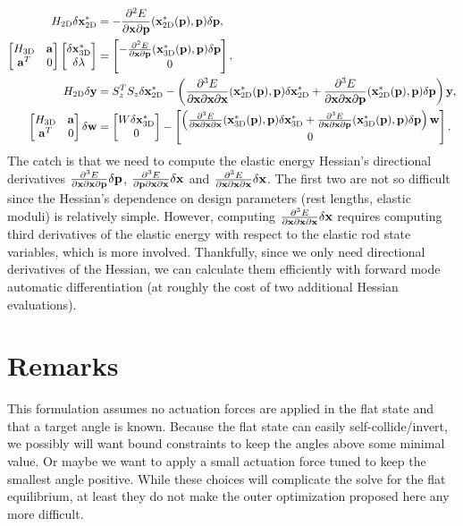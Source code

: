 \documentclass[10pt]{article}
\providecommand{\spder}[3]{\frac{\partial^2 #1}{\partial #2 \partial #3}}
\providecommand{\tpder}[4]{\frac{\partial^3 #1}{\partial #2 \partial #3 \partial #4}}
\renewcommand{\vec}[1]{{\bf #1}}
\def\a{\vec{a}}
\def\x{\vec{x}}
\def\y{\vec{y}}
\def\w{\vec{w}}
\def\p{\vec{p}}
\def\xflat{\vec{x}^*_\text{2D}}
\def\xdeploy{\vec{x}^*_\text{3D}}
\def\delp{\delta \p}
\def\delxflat{\delta \xflat}
\def\delxdeploy{\delta \xdeploy}
\def\delw{\delta \w}
\def\dely{\delta \y}
\begin{document}
\begin{align*}
    H_\text{2D} \delxflat &= -\spder{E}{\x}{\p}(\xflat(\p), \p) \delp, \\
    \begin{bmatrix} H_\text{3D} & \a \\ \a^T & 0 \end{bmatrix}\begin{bmatrix}\delxdeploy \\ \delta \lambda \end{bmatrix} &= \begin{bmatrix} -\spder{E}{\x}{\p}(\xdeploy(\p), \p) \delp \\ 0 \end{bmatrix}, \\
        H_{\text{2D}} \dely &= S_z^T S_z \delxflat - \left(\tpder{E}{\x}{\x}{\x}(\xflat(\p), \p) \delxflat + \tpder{E}{\x}{\x}{\p}(\xflat(\p), \p) \delp\right) \y, \\
    \begin{bmatrix} H_\text{3D} & \a \\ \a^T & 0 \end{bmatrix} \delw &=
    \begin{bmatrix} W \delxdeploy \\ 0\end{bmatrix}
        -
    \begin{bmatrix}\left(\tpder{E}{\x}{\x}{\x}(\xdeploy(\p), \p) \delxdeploy + \tpder{E}{\x}{\x}{\p}(\xdeploy(\p), \p) \delp\right) \w \\ 0 \end{bmatrix}.
\end{align*}
The catch is that we need to compute the elastic energy Hessian's directional derivatives
$\tpder{E}{\x}{\x}{\p} \delp$,
$\tpder{E}{\p}{\x}{\x} \delta \x$ and
$\tpder{E}{\x}{\x}{\x} \delta \x$. The first two are not so difficult since the
Hessian's dependence on design parameters (rest lengths, elastic moduli) is relatively simple.
However, computing $\tpder{E}{\x}{\x}{\x} \delta \x$ requires computing third derivatives of the
elastic energy with respect to the elastic rod state variables, which is more involved. Thankfully,
since we only need directional derivatives of the Hessian, we can calculate them efficiently with forward
mode automatic differentiation (at roughly the cost of two additional Hessian evaluations).

\section{Remarks}
This formulation assumes no actuation forces are applied in the flat state and that a target angle is known.
Because the flat state can easily self-collide/invert, we possibly will
want bound constraints to keep the angles above some minimal value. Or maybe we want to apply a small actuation force
tuned to keep the smallest angle positive. While these choices will complicate the solve for the flat equilibrium,
at least they do not make the outer optimization proposed here any more difficult.
\end{document}

